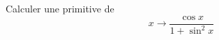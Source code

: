 Calculer une primitive de 
\begin{displaymath}
 x \rightarrow \frac{\cos x}{1+ \sin^2x}
\end{displaymath}
\bigskip \bigskip